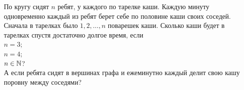 \documentclass[a4paper, 12pt]{article}
\begin{document}
По кругу сидят $n$ ребят, у каждого по тарелке каши.
Каждую минуту одновременно %
каждый из ребят берет себе
по половине каши своих соседей. Сначала в тарелках было
$1, 2, \dots, n$ поварешек каши.
Сколько каши будет в тарелках спустя достаточно долгое время, если\\
 $n=3$;\\
 $n=4$;\\
 $n\in\mathbb{N}$?\\
 А если ребята сидят в вершинах графа
и ежеминутно каждый делит свою кашу поровну между соседями?




\end{document}
